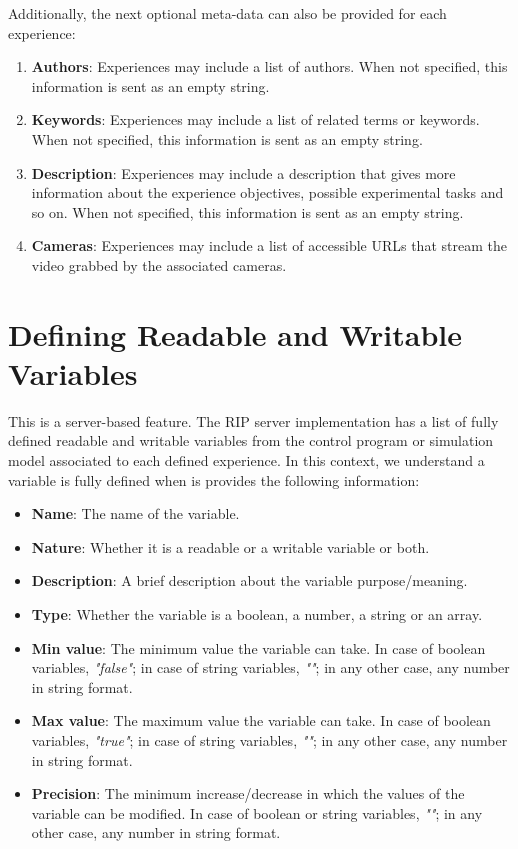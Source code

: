 Additionally, the next optional meta-data can also be provided for each experience:

\begin{enumerate}
    \item \textbf{Authors}: Experiences may include a list of authors. When not specified, this information is sent as an empty string.
    \item \textbf{Keywords}: Experiences may include a list of related terms or keywords. When not specified, this information is sent as an empty string.
    \item \textbf{Description}: Experiences may include a description that gives more information about the experience objectives, possible experimental tasks and so on. When not specified, this information is sent as an empty string.
    \item \textbf{Cameras}: Experiences may include a list of accessible URLs that stream the video grabbed by the associated cameras.
\end{enumerate}

\section{Defining Readable and Writable Variables}
This is a server-based feature. The RIP server implementation has a list of fully defined readable and writable variables from the control program or simulation model associated to each defined experience. In this context, we understand a variable is fully defined when is provides the following information:

\begin{itemize}
    \item \textbf{Name}: The name of the variable.
    \item \textbf{Nature}: Whether it is a readable or a writable variable or both.
    \item \textbf{Description}: A brief description about the variable purpose/meaning.
    \item \textbf{Type}: Whether the variable is a boolean, a number, a string or an array.
    \item \textbf{Min value}: The minimum value the variable can take. In case of boolean variables, \textit{"false"}; in case of string variables, \textit{""}; in any other case, any number in string format.
    \item \textbf{Max value}: The maximum value the variable can take. In case of boolean variables, \textit{"true"}; in case of string variables, \textit{""}; in any other case, any number in string format.
    \item \textbf{Precision}: The minimum increase/decrease in which the values of the variable can be modified. In case of boolean or string variables, \textit{""}; in any other case, any number in string format.
\end{itemize}

